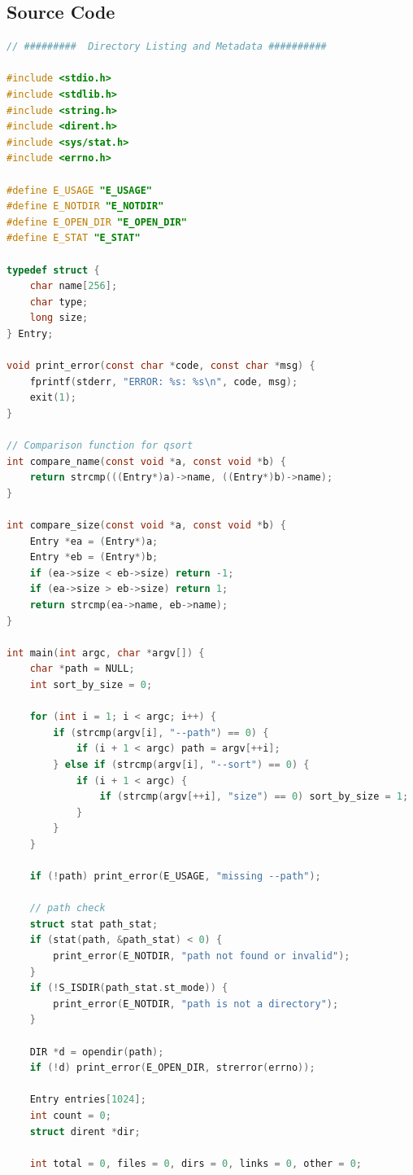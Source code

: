 \subsection{Source Code}
\begin{lstlisting}[language=C, caption={dirreport.c}]
// #########  Directory Listing and Metadata ##########

#include <stdio.h>
#include <stdlib.h>
#include <string.h>
#include <dirent.h>
#include <sys/stat.h>
#include <errno.h>

#define E_USAGE "E_USAGE"
#define E_NOTDIR "E_NOTDIR"
#define E_OPEN_DIR "E_OPEN_DIR"
#define E_STAT "E_STAT"

typedef struct {
    char name[256];
    char type;
    long size;
} Entry;

void print_error(const char *code, const char *msg) {
    fprintf(stderr, "ERROR: %s: %s\n", code, msg);
    exit(1);
}

// Comparison function for qsort
int compare_name(const void *a, const void *b) {
    return strcmp(((Entry*)a)->name, ((Entry*)b)->name);
}

int compare_size(const void *a, const void *b) {
    Entry *ea = (Entry*)a;
    Entry *eb = (Entry*)b;
    if (ea->size < eb->size) return -1;
    if (ea->size > eb->size) return 1;
    return strcmp(ea->name, eb->name);
}

int main(int argc, char *argv[]) {
    char *path = NULL;
    int sort_by_size = 0;

    for (int i = 1; i < argc; i++) {
        if (strcmp(argv[i], "--path") == 0) {
            if (i + 1 < argc) path = argv[++i];
        } else if (strcmp(argv[i], "--sort") == 0) {
            if (i + 1 < argc) {
                if (strcmp(argv[++i], "size") == 0) sort_by_size = 1;
            }
        }
    }

    if (!path) print_error(E_USAGE, "missing --path");

    // path check
    struct stat path_stat;
    if (stat(path, &path_stat) < 0) {
        print_error(E_NOTDIR, "path not found or invalid"); 
    }
    if (!S_ISDIR(path_stat.st_mode)) {
        print_error(E_NOTDIR, "path is not a directory");
    }

    DIR *d = opendir(path);
    if (!d) print_error(E_OPEN_DIR, strerror(errno));

    Entry entries[1024];
    int count = 0;
    struct dirent *dir;

    int total = 0, files = 0, dirs = 0, links = 0, other = 0;


\end{lstlisting}
